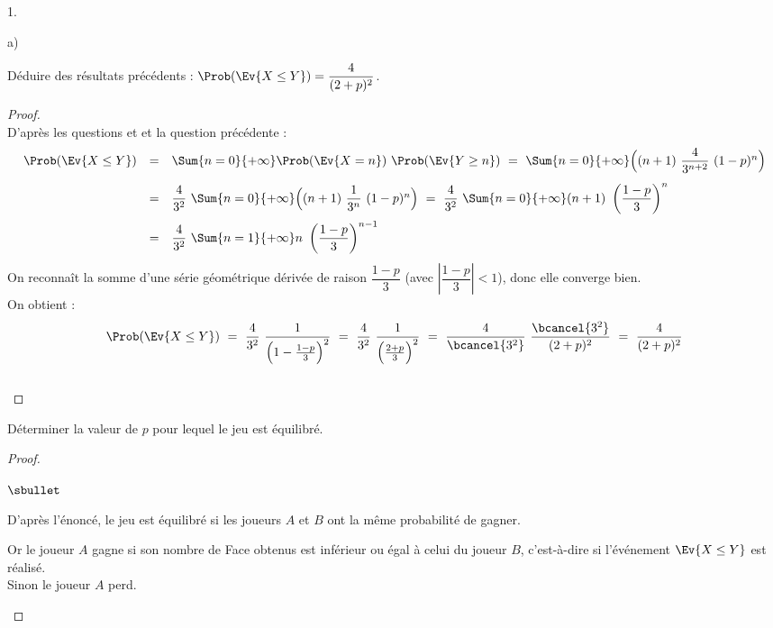 \documentclass[11pt]{article}%
\begin{document}
\begin{noliste}{1.}
\begin{noliste}{a)}
  \item Déduire des résultats précédents : $\Prob(\Ev{X \leq Y}) =
    \dfrac{4}{(2+p)^2}$.
    
    \begin{proof}~\\
      D'après les questions  et  et la question 
      précédente :
      \[
        \begin{array}{rcl}
          \Prob(\Ev{X \leq Y}) & = &  \Sum{n=0}{+\infty}
          \Prob(\Ev{X=n}) \ \Prob(\Ev{Y \geq n})
          \ = \ \Sum{n=0}{+\infty} \Big( (n+1) \ \dfrac{4}{3^{n+2}} \
          (1-p)^n\Big)
          \\[.4cm]
          & = &  \dfrac{4}{3^2} \ \Sum{n=0}{+\infty} \Big( (n+1) \ 
          \dfrac{1}{3^n} \ (1-p)^n \Big)
          \ = \ \dfrac{4}{3^2} \ \Sum{n=0}{+\infty} (n+1) \
          \left( \dfrac{1-p}{3}\right)^n
          \\[.4cm]
          & = &  \dfrac{4}{3^2} \ \Sum{n=1}{+\infty} n \ \left(
          \dfrac{1-p}{3}\right)^{n-1} 
        \end{array}
      \]
      On reconnaît la somme d'une série géométrique dérivée de raison 
      $\dfrac{1-p}{3}$ (avec $\left\vert \dfrac{1-p}{3} \right\vert 
      <1$), donc elle converge bien.\\
      On obtient :
      \[
        \Prob(\Ev{X \leq Y}) \ = \ \dfrac{4}{3^2} \ 
        \dfrac{1}{\Big(1- \frac{1-p}{3}\Big)^2}
        \ = \ \dfrac{4}{3^2} \ \dfrac{1}{\Big(\frac{2+p}{3}\Big)^2}
        \ = \ \dfrac{4}{\bcancel{3^2}} \ 
        \dfrac{\bcancel{3^2}}{(2+p)^2} \ = \ 
        \dfrac{4}{(2+p)^2}
      \]
      ~\\[-1cm]
    \end{proof}

    
    \item Déterminer la valeur de $p$ pour lequel le jeu est équilibré.
    
    \begin{proof}~
      \begin{noliste}{$\sbullet$}
	\item D'après l'énoncé, le jeu est équilibré si les joueurs $A$
	et $B$ ont la même probabilité de gagner.
	
	\item Or le joueur $A$ gagne si son nombre de Face obtenus est 
	inférieur ou égal à celui du joueur $B$, c'est-à-dire si 
	l'événement $\Ev{X \leq Y}$ est réalisé.\\
	Sinon le joueur $A$ perd.
	

\end{noliste}
\end{proof}
\end{noliste}
\end{noliste}
\end{document}
